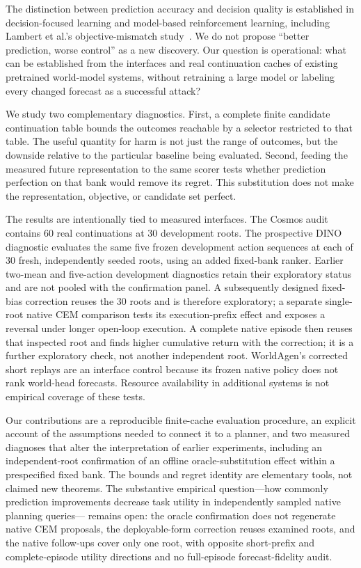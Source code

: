 \documentclass[11pt]{article}
\begin{document}
The distinction between prediction accuracy and decision quality is established
in decision-focused learning and model-based reinforcement learning, including
Lambert et al.'s objective-mismatch study~\cite{lambert2020mismatch}. We do
not propose ``better prediction, worse control'' as a new discovery. Our question is operational: what can be
established from the interfaces and real continuation caches of existing
pretrained world-model systems, without retraining a large model or labeling
every changed forecast as a successful attack?

We study two complementary diagnostics. First, a complete finite candidate
continuation table bounds the outcomes reachable by a selector restricted to
that table. The useful quantity for harm is not just the range of outcomes,
but the downside relative to the particular baseline being evaluated. Second,
feeding the measured future representation to the same scorer tests whether
prediction perfection on that bank would remove its regret. This substitution
does not make the representation, objective, or candidate set perfect.

The results are intentionally tied to measured interfaces. The Cosmos audit
contains 60 real continuations at 30 development roots. The prospective DINO
diagnostic evaluates the same five frozen development action sequences at each
of 30 fresh, independently seeded roots, using an added fixed-bank ranker.
Earlier two-mean and five-action development diagnostics retain their exploratory
status and are not pooled with the confirmation panel. A subsequently designed
fixed-bias correction reuses the 30 roots and is therefore exploratory; a
separate single-root native CEM comparison tests its execution-prefix effect
and exposes a reversal under longer open-loop execution. A complete native
episode then reuses that inspected root and finds higher cumulative return
with the correction; it is a further exploratory check, not another independent
root. WorldAgen's corrected short replays are an
interface control because its frozen native policy does not rank world-head
forecasts. Resource availability in additional systems is not empirical
coverage of these tests.

Our contributions are a reproducible finite-cache evaluation procedure, an
explicit account of the assumptions needed to connect it to a planner, and
two measured diagnoses that alter the interpretation of earlier experiments,
including an independent-root confirmation of an offline oracle-substitution
effect within a prespecified fixed bank.
The bounds and regret identity are elementary tools, not claimed new theorems.
The substantive empirical question---how commonly prediction improvements
decrease task utility in independently sampled native planning queries---
remains open: the oracle confirmation does not regenerate native CEM proposals,
the deployable-form correction reuses examined roots, and the native
follow-ups cover only one root, with opposite short-prefix and complete-episode
utility directions and no full-episode forecast-fidelity audit.
\end{document}

